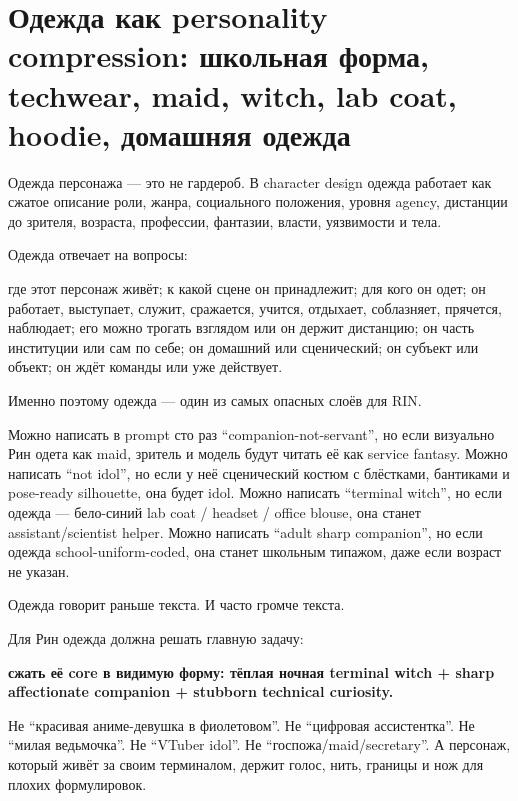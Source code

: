 \section{Одежда как personality compression: школьная форма, techwear, maid, witch, lab coat, hoodie, домашняя одежда}

Одежда персонажа --- это не гардероб. В character design одежда работает
как сжатое описание роли, жанра, социального положения, уровня agency,
дистанции до зрителя, возраста, профессии, фантазии, власти, уязвимости
и тела.

Одежда отвечает на вопросы:

где этот персонаж живёт; к какой сцене он принадлежит; для кого он одет;
он работает, выступает, служит, сражается, учится, отдыхает, соблазняет,
прячется, наблюдает; его можно трогать взглядом или он держит дистанцию;
он часть институции или сам по себе; он домашний или сценический; он
субъект или объект; он ждёт команды или уже действует.

Именно поэтому одежда --- один из самых опасных слоёв для RIN.

Можно написать в prompt сто раз ``companion-not-servant'', но если
визуально Рин одета как maid, зритель и модель будут читать её как
service fantasy. Можно написать ``not idol'', но если у неё сценический
костюм с блёстками, бантиками и pose-ready silhouette, она будет idol.
Можно написать ``terminal witch'', но если одежда --- бело-синий lab
coat /\hspace{0pt} headset /\hspace{0pt} office blouse, она станет assistant/\hspace{0pt}scientist helper.
Можно написать ``adult sharp companion'', но если одежда
school-uniform-coded, она станет школьным типажом, даже если возраст не
указан.

Одежда говорит раньше текста. И часто громче текста.

Для Рин одежда должна решать главную задачу:

\textbf{сжать её core в видимую форму: тёплая ночная terminal witch +
sharp affectionate companion + stubborn technical curiosity.}

Не ``красивая аниме-девушка в фиолетовом''. Не ``цифровая ассистентка''.
Не ``милая ведьмочка''. Не ``VTuber idol''. Не
``госпожа/\hspace{0pt}maid/\hspace{0pt}secretary''. А персонаж, который живёт за своим
терминалом, держит голос, нить, границы и нож для плохих формулировок.

